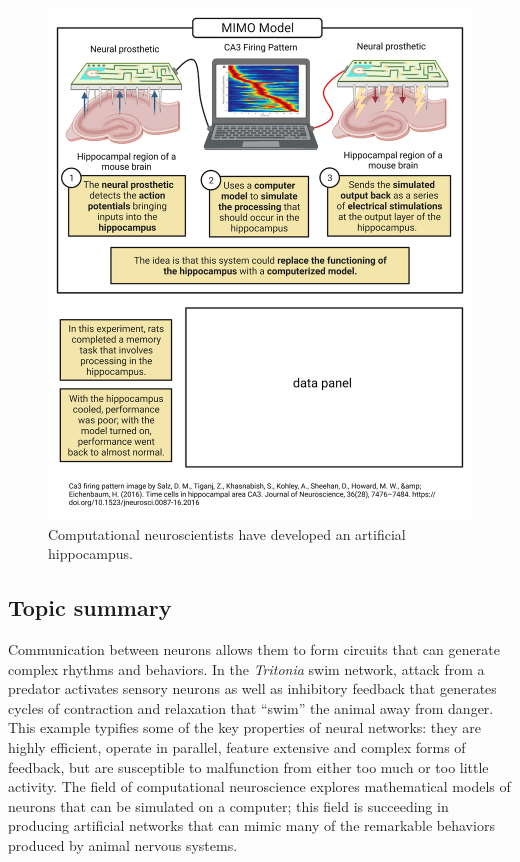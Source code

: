 \documentclass[
]{book}
\begin{document}
\begin{figure}

{\centering \includegraphics[width=0.9\linewidth]{images/ch02/02_09} 

}

\caption{Computational neuroscientists have developed an artificial hippocampus.}\label{fig:ch02-prosthetic}
\end{figure}

\hypertarget{topic-summary-1}{%
\subsection{Topic summary}\label{topic-summary-1}}

Communication between neurons allows them to form circuits that can generate complex rhythms and behaviors. In the \emph{Tritonia} swim network, attack from a predator activates sensory neurons as well as inhibitory feedback that generates cycles of contraction and relaxation that ``swim'' the animal away from danger. This example typifies some of the key properties of neural networks: they are highly efficient, operate in parallel, feature extensive and complex forms of feedback, but are susceptible to malfunction from either too much or too little activity. The field of computational neuroscience explores mathematical models of neurons that can be simulated on a computer; this field is succeeding in producing artificial networks that can mimic many of the remarkable behaviors produced by animal nervous systems.
\end{document}
